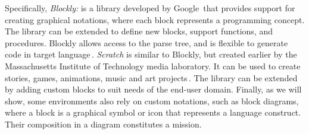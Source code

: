 Specifically, \emph{Blockly:} is a library developed by Google\,\cite{blockly} that provides support for creating graphical notations, where each block represents a programming concept. %
The library can be extended to define new blocks, support functions, and procedures. Blockly allows access to the parse tree, and is flexible to generate code in target language\,\cite{Passault2016}.
\emph{Scratch} is similar to Blockly, but created earlier by the Massachusetts Institute of Technology media laboratory. It can be used to create stories, games, animations, music and art projects\,\cite{Kaucic2015}. The library can be extended by adding custom blocks to suit needs of the end-user domain. %
Finally, as we will show, some environments also rely on custom notations, such as block diagrams, where a block is a graphical symbol or icon that represents a language construct. Their composition in a diagram constitutes a mission.



